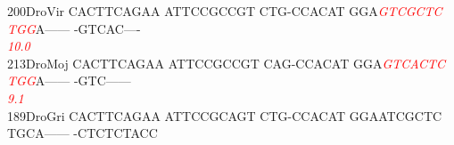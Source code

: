 \documentclass[11pt,twoside,reqno,a4paper]{article}
\begin{document}
{200\hspace*{1\charwidth}DroVir	CACTTCAGAA	ATTCCGCCGT	CTG-CCACAT	GGA\textit{\textcolor{red}{G}}\textit{\textcolor{red}{T}}\textit{\textcolor{red}{C}}\textit{\textcolor{red}{G}}\textit{\textcolor{red}{C}}\textit{\textcolor{red}{T}}\textit{\textcolor{red}{C}}	\textit{\textcolor{red}{T}}\textit{\textcolor{red}{G}}\textit{\textcolor{red}{G}}A------	-GTCAC----	\\
\hspace*{4\charwidth}\hspace*{7\charwidth}\hspace*{1\charwidth}\hspace*{1\charwidth}\hspace*{1\charwidth}\hspace*{33\charwidth}\textit{\textcolor{red}{10.0}}\hspace*{1\charwidth}\hspace*{1\charwidth}\hspace*{1\charwidth}\\
213\hspace*{1\charwidth}DroMoj	CACTTCAGAA	ATTCCGCCGT	CAG-CCACAT	GGA\textit{\textcolor{red}{G}}\textit{\textcolor{red}{T}}\textit{\textcolor{red}{C}}\textit{\textcolor{red}{A}}\textit{\textcolor{red}{C}}\textit{\textcolor{red}{T}}\textit{\textcolor{red}{C}}	\textit{\textcolor{red}{T}}\textit{\textcolor{red}{G}}\textit{\textcolor{red}{G}}A------	-GTC------	\\
\hspace*{4\charwidth}\hspace*{7\charwidth}\hspace*{1\charwidth}\hspace*{1\charwidth}\hspace*{1\charwidth}\hspace*{33\charwidth}\textit{\textcolor{red}{9.1}}\hspace*{1\charwidth}\hspace*{1\charwidth}\hspace*{1\charwidth}\\
189\hspace*{1\charwidth}DroGri	CACTTCAGAA	ATTCCGCAGT	CTG-CCACAT	GGAATCGCTC	TGCA------	-CTCTCTACC	\\
\hspace*{4\charwidth}\hspace*{7\charwidth}\hspace*{1\charwidth}\hspace*{1\charwidth}\hspace*{1\charwidth}\hspace*{1\charwidth}\hspace*{1\charwidth}\hspace*{1\charwidth}\\
}
\end{document}
